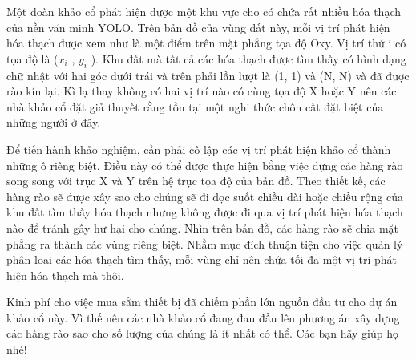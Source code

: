 Một đoàn khảo cổ phát hiện được một khu vực cho có chứa rất nhiều hóa thạch của nền văn minh YOLO. Trên bản đồ của vùng đất này, mỗi vị trí phát hiện hóa thạch được xem như là một điểm trên mặt phẳng tọa độ Oxy. Vị trí thứ i có tọa độ là ($x_{i}$ , $y_{i}$ ). Khu đất mà tất cả các hóa thạch được tìm thấy có hình dạng chữ nhật với hai góc dưới trái và trên phải lần lượt là (1, 1) và (N, N) và đã được rào kín lại. Kì lạ thay không có hai vị trí nào có cùng tọa độ X hoặc Y nên các nhà khảo cổ đặt giả thuyết rằng tồn tại một nghi thức chôn cất đặt biệt của những người ở đây.

Để tiến hành khảo nghiệm, cần phải cô lập các vị trí phát hiện khảo cổ thành những ô riêng biệt. Điều này có thể được thực hiện bằng việc dựng các hàng rào song song với trục X và Y trên hệ trục tọa độ của bản đồ. Theo thiết kế, các hàng rào sẽ được xây sao cho chúng sẽ đi dọc suốt chiều dài hoặc chiều rộng của khu đất tìm thấy hóa thạch nhưng không được đi qua vị trí phát hiện hóa thạch nào để tránh gây hư hại cho chúng. Nhìn trên bản đồ, các hàng rào sẽ chia mặt phẳng ra thành các vùng riêng biệt. Nhằm mục đích thuận tiện cho việc quản lý phân loại các hóa thạch tìm thấy, mỗi vùng chỉ nên chứa tối đa một vị trí phát hiện hóa thạch mà thôi.

Kinh phí cho việc mua sắm thiết bị đã chiếm phần lớn nguồn đầu tư cho dự án khảo cổ này. Vì thế nên các nhà khảo cổ đang đau đầu lên phương án xây dựng các hàng rào sao cho số lượng của chúng là ít nhất có thể. Các bạn hãy giúp họ nhé!
\begin{itemize}
\end{itemize}